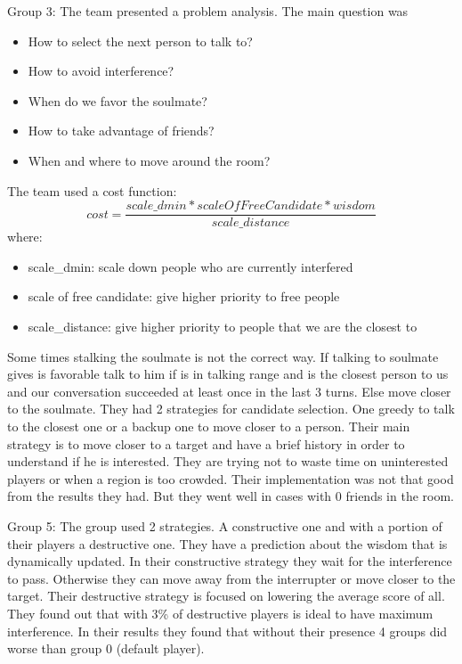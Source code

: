 Group 3:
The team presented a problem analysis. The main question was 
\begin{itemize}
\item How to select the next person to talk to?
\item How to avoid interference?
\item When do we favor the soulmate?
\item How to take advantage of friends?
\item When and where to move around the room?
\end{itemize}

The team used a cost function:
\begin{equation*}
cost = \frac{scale\_dmin*scaleOfFreeCandidate*wisdom}{scale\_distance}
\end{equation*}
where:
\begin{itemize}
\item scale\_dmin: scale down people who are currently interfered
\item scale of free candidate: give higher priority to free people
\item scale\_distance: give higher priority to people that we are the closest to 
\end{itemize}

Some times stalking the soulmate is not the correct way. If talking to soulmate 
gives is favorable talk to him if is in talking range and is the closest person
to us and our conversation succeeded at least once in the last 3 turns. Else
move closer to the soulmate. They had 2 strategies for candidate selection. One 
greedy to talk to the closest one or a backup one to move closer to a person.
Their main strategy is to move closer to a target and have a brief history in 
order to understand if he is interested. They are trying not to waste time on
uninterested players or when a region is too crowded. Their implementation 
was not that good from the results they had. But they went well in cases with
0 friends in the room.

Group 5:
The group used 2 strategies. A constructive one and with a portion of their players
a destructive one. They have a prediction about the wisdom that is dynamically 
updated. In their constructive strategy they wait for the interference to pass.
Otherwise they can move away from the interrupter or move closer to the target.
Their destructive strategy is focused on lowering the average score of all.
They found out that with 3\% of destructive players is ideal to have maximum 
interference. In their results they found that without their presence 4 groups
did worse than group 0 (default player).

